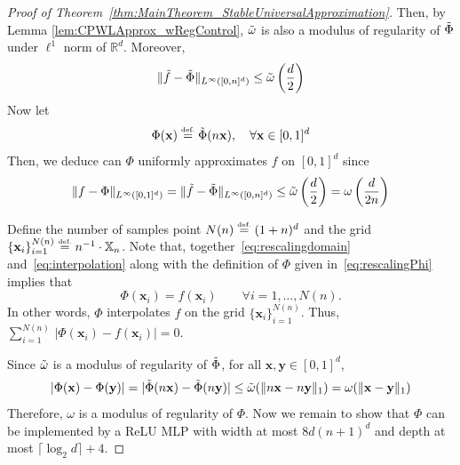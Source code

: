 \documentclass{article}
\numberwithin{equation}{section}
\theoremstyle{definition}
\newcommand{\eqdef}{\ensuremath{\stackrel{\mbox{\upshape\tiny def.}}{=}}}
\begin{document}
\begin{proof}[{Proof of Theorem~\ref{thm:MainTheorem_StableUniversalApproximation}}]
Then, by Lemma \ref{lem:CPWLApprox_wRegControl}, $\Tilde{\omega}$ is also a modulus of regularity of $\Tilde{\Phi}$ under $\ell^1$ norm of $\mathbb{R}^d$. Moreover, 
$$\| \Tilde{f}-\Tilde{\Phi} \|_{L^{\infty}([0,n]^d)} \le 
\Tilde{\omega} \left( \frac{d}{2} \right)$$
Now let 
\begin{equation}
\label{eq:rescalingPhi}
\Phi(\mathbf{x})  \eqdef  \Tilde{\Phi}(n\mathbf{x}), \quad 
\forall \mathbf{x}\in[0,1]^d
\end{equation}
Then, we deduce can $\Phi$ uniformly approximates $f$ on $[0,1]^d$ since
$$\| f-\Phi \|_{L^{\infty}([0,1]^d)}
= \| \Tilde{f}-\Tilde{\Phi} \|_{L^{\infty}([0,n]^d)} 
\le \Tilde{\omega} \left( \frac{d}{2} \right)
= \omega\left(\frac{d}{2n}\right)$$

Define the number of samples point $N(n)\eqdef (1+n)^d$ and the grid $\{\mathbf{x}_i\}_{i=1}^{N(n)}\eqdef n^{-1}\cdot \mathbb{X}_n$.  Note that, together~\eqref{eq:rescalingdomain} and~\eqref{eq:interpolation} along with the definition of $\Phi$ given in~\eqref{eq:rescalingPhi} implies that
\[
    \Phi(\mathbf{x}_i) = f(\mathbf{x}_i)
    \qquad
    \forall i=1,\dots,N(n)
.
\]
In other words, $\Phi$ interpolates $f$ on the grid $\{\mathbf{x}_i\}_{i=1}^{N(n)}$.  Thus, $\sum_{i=1}^{N(n)}\, |\Phi(\mathbf{x}_i)-f(\mathbf{x}_i)|=0$.


Since $\Tilde{\omega}$ is a modulus of regularity of $\Tilde{\Phi}$, for all $\mathbf{x},\mathbf{y}\in[0,1]^d$, 
$$| \Phi(\mathbf{x}) - \Phi(\mathbf{y}) |
= | \Tilde{\Phi}(n\mathbf{x}) - \Tilde{\Phi}(n\mathbf{y}) |
\le \Tilde{\omega} ( \|n\mathbf{x} - n\mathbf{y}\|_1 )
= \omega( \|\mathbf{x} - \mathbf{y}\|_1 )$$
Therefore, $\omega$ is a modulus of regularity of $\Phi$. Now we remain to show that $\Phi$ can be implemented by a ReLU MLP with width at most $8d(n+1)^d$ and depth at most $\lceil \log_2{d} \rceil + 4$.


\end{proof}
\end{document}
